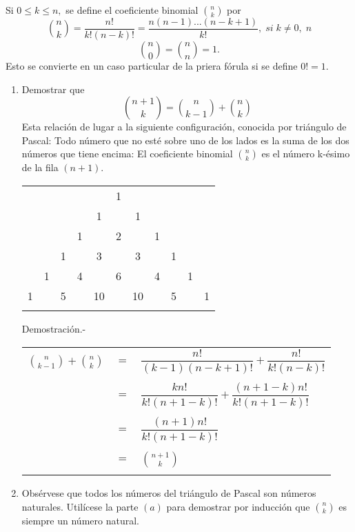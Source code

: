\begin{teo}
Si $0 \leq k \leq n,$ se define el coeficiente binomial $ {n \choose k} $ por $${n \choose k} = \dfrac{n!}{k!(n-k)!}=\dfrac{n(n-1)...(n - k + 1)}{k!}, \; si \; k \neq 0, \; n$$ $${n \choose 0} = {n \choose n} = 1.$$ Esto se convierte en un caso particular de la priera fórula si se define $0! = 1.$
\begin{enumerate}[\bfseries a)]
\item Demostrar que $${n +1 \choose k} = {n \choose k - 1} + {n \choose k}$$ Esta relación de lugar a la siguiente configuración, conocida por triángulo de Pascal: Todo número que no esté sobre uno de los lados es la suma de los dos números que tiene encima: El coeficiente binomial ${n \choose k}$ es el número k-ésimo de la fila $(n+1)$.
\begin{center}
\begin{tabular}{ccccccccccc}
  &    &    &    &    &  1 &    &    &    &    &   \\
  &    &    &    &  1 &    &  1 &    &    &    &   \\
  &    &    &  1 &    &  2 &    &  1 &    &    &   \\
  &    &  1 &    &  3 &    &  3 &    &  1 &    &   \\
  &  1 &    &  4 &    &  6 &    &  4 &    &  1 &   \\
1 &    &  5 &    & 10 &    & 10 &    &  5 &    & 1 \\\\
\end{tabular}
\end{center}
Demostración.- \; \\
\begin{center}
\begin{tabular}{r c l}
$ {n \choose k-1}  +  {n \choose k} $&$=$&$\dfrac{n!}{(k-1)(n-k+1)!}+ \dfrac{n!}{k!(n-k)!}$\\\\
&$=$&$\dfrac{kn!}{k!(n+1-k)!} + \dfrac{(n+1-k)n!}{k!(n+1-k)!}$\\\\
&$=$&$\dfrac{(n+1)n!}{k!(n+1-k)!}$\\\\
&$=$&$ {n+1 \choose k} $\\\\
\end{tabular}
\end{center}
\item Obsérvese que todos los números del triángulo de Pascal son números naturales. Utilícese la parte $(a)$ para demostrar por inducción que $ {n \choose k}$ es siempre un número natural.\\\\

\end{enumerate}
\end{teo}
